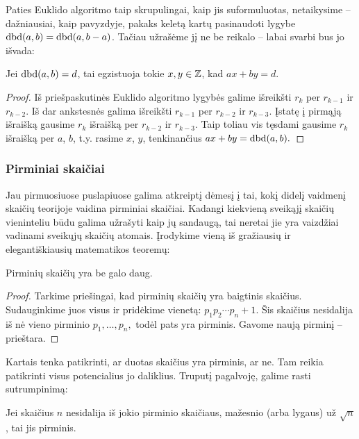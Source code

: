 Paties Euklido algoritmo taip skrupulingai, kaip jis suformuluotas,
netaikysime -- dažniausiai, kaip pavyzdyje, pakaks keletą kartų pasinaudoti
lygybe $\operatorname{dbd}(a,b) = \operatorname{dbd}(a, b-a)$. Tačiau užrašėme jį ne be reikalo -- labai
svarbi bus jo išvada:

\begin{isv} 
  Jei $\operatorname{dbd}(a,b)=d$, tai egzistuoja tokie $x,y \in \mathbb Z$, kad $ax + by = d$.
\end{isv}

\begin{proof}
  Iš priešpaskutinės Euklido algoritmo lygybės galime išreikšti $r_{k}$ per
  $r_{k-1}$ ir $r_{k-2}$. Iš dar ankstesnės galima išreikšti $r_{k-1}$ per
  $r_{k-2}$ ir $r_{k-3}$. Įstatę į pirmąją išraišką gausime $r_{k}$ išraišką
  per $r_{k-2}$ ir $r_{k-3}$. Taip toliau vis tęsdami gausime $r_{k}$ išraišką
  per $a$, $b$, t.y. rasime $x$, $y$, tenkinančius $ax + by = \operatorname{dbd}(a,b).$
\end{proof}

\subsubsection{Pirminiai skaičiai}

Jau pirmuosiuose puslapiuose galima atkreiptį dėmesį į tai, kokį didelį vaidmenį
skaičių teorijoje vaidina pirminiai skaičiai. Kadangi kiekvieną sveikąjį
skaičių vieninteliu būdu galima užrašyti kaip jų sandaugą, tai neretai jie
yra vaizdžiai vadinami sveikųjų skaičių atomais. Įrodykime vieną iš
gražiausių ir elegantiškiausių matematikos teoremų:

\begin{thm} 
  Pirminių skaičių yra be galo daug.  
\end{thm} 

\begin{proof} 
  Tarkime priešingai, kad pirminių skaičių yra baigtinis skaičius.
  Sudauginkime juos visus ir pridėkime vienetą: $p_1p_2\cdots p_n + 1$. Šis
  skaičius nesidalija iš nė vieno pirminio $p_1, \dots, p_n,$ todėl pats
  yra pirminis. Gavome naują pirminį -- prieštara.
\end{proof}

Kartais tenka patikrinti, ar duotas skaičius yra pirminis, ar ne. Tam reikia
patikrinti visus potencialius jo daliklius. Truputį pagalvoję, galime rasti
sutrumpinimą: 

\begin{teig} 
  Jei skaičius $n$ nesidalija iš jokio pirminio skaičiaus, mažesnio (arba
  lygaus) už $\sqrt{n}$, tai jis pirminis.
\end{teig} 

